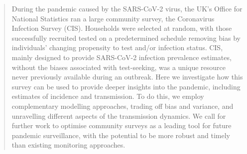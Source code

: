 \documentclass[9pt,twocolumn,twoside]{pnas-new}
\begin{document}



\begin{abstract}
During the pandemic caused by the SARS-CoV-2 virus, the UK’s Office for National Statistics ran a large community survey, the Coronavirus Infection Survey (CIS).
Households were selected at random, with those successfully recruited tested on a predetermined schedule removing bias by individuals' changing propensity to test and/or infection status.
CIS, mainly designed to provide SARS-CoV-2 infection prevalence estimates, without the biases associated with test-seeking, was a unique resource never previously available during an outbreak.
Here we investigate how this survey can be used to provide deeper insights into the pandemic, including estimates of incidence and transmission.
To do this, we employ complementary modelling approaches, trading off bias and variance, and unravelling different aspects of the transmission dynamics.
We call for further work to optimise community surveys as a leading tool for future pandemic surveillance, with the potential to be more robust and timely than existing monitoring approaches.
\end{abstract}

\end{document}

